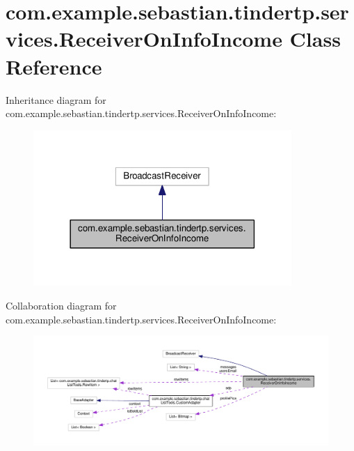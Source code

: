 \hypertarget{classcom_1_1example_1_1sebastian_1_1tindertp_1_1services_1_1ReceiverOnInfoIncome}{}\section{com.\+example.\+sebastian.\+tindertp.\+services.\+Receiver\+On\+Info\+Income Class Reference}
\label{classcom_1_1example_1_1sebastian_1_1tindertp_1_1services_1_1ReceiverOnInfoIncome}


Inheritance diagram for com.\+example.\+sebastian.\+tindertp.\+services.\+Receiver\+On\+Info\+Income\+:\nopagebreak
\begin{figure}[H]
\begin{center}
\leavevmode
\includegraphics[width=278pt]{classcom_1_1example_1_1sebastian_1_1tindertp_1_1services_1_1ReceiverOnInfoIncome__inherit__graph}
\end{center}
\end{figure}


Collaboration diagram for com.\+example.\+sebastian.\+tindertp.\+services.\+Receiver\+On\+Info\+Income\+:\nopagebreak
\begin{figure}[H]
\begin{center}
\leavevmode
\includegraphics[width=350pt]{classcom_1_1example_1_1sebastian_1_1tindertp_1_1services_1_1ReceiverOnInfoIncome__coll__graph}
\end{center}
\end{figure}
